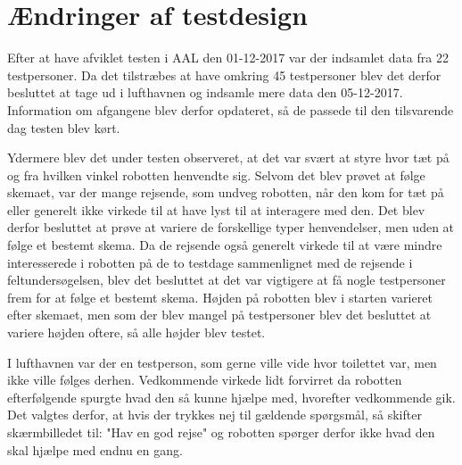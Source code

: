 \section{Ændringer af testdesign}
\label{TestAfSkalaerAendringerTD}
%
Efter at have afviklet testen i AAL den 01-12-2017 var der indsamlet data fra 22 testpersoner. Da det tilstræbes at have omkring 45 testpersoner blev det derfor besluttet at tage ud i lufthavnen og indsamle mere data den 05-12-2017. Information om afgangene blev derfor opdateret, så de passede til den tilsvarende dag testen blev kørt. 

Ydermere blev det under testen observeret, at det var svært at styre hvor tæt på og fra hvilken vinkel robotten henvendte sig. Selvom det blev prøvet at følge skemaet, var der mange rejsende, som undveg robotten, når den kom for tæt på eller generelt ikke virkede til at have lyst til at interagere med den. Det blev derfor besluttet at prøve at variere de forskellige typer henvendelser, men uden at følge et bestemt skema. Da de rejsende også generelt virkede til at være mindre interesserede i robotten på de to testdage sammenlignet med de rejsende i feltundersøgelsen, blev det besluttet at det var vigtigere at få nogle testpersoner frem for at følge et bestemt skema. Højden på robotten blev i starten varieret efter skemaet, men som der blev mangel på testpersoner blev det besluttet at variere højden oftere, så alle højder blev testet.

I lufthavnen var der en testperson, som gerne ville vide hvor toilettet var, men ikke ville følges derhen. Vedkommende virkede lidt forvirret da robotten efterfølgende spurgte hvad den så kunne hjælpe med, hvorefter vedkommende gik. Det valgtes derfor, at hvis der trykkes nej til gældende spørgsmål, så skifter skærmbilledet til: "Hav en god rejse" og robotten spørger derfor ikke hvad den skal hjælpe med endnu en gang.

